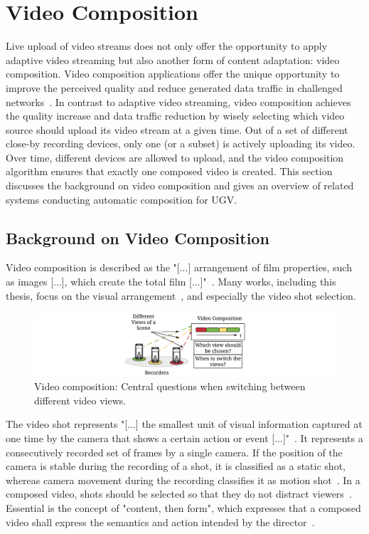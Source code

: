 \section{Video Composition}
\label{sec:240_videocomposition}
Live upload of video streams does not only offer the opportunity to apply adaptive video streaming but also another form of content adaptation: video composition.
Video composition applications offer the unique opportunity to improve the perceived quality and reduce generated data traffic in challenged networks~\cite{Arev2014,Saini2012,Shrestha2010,Wu2015}.
In contrast to adaptive video streaming, video composition achieves the quality increase and data traffic reduction by wisely selecting which video source should upload its video stream at a given time.
Out of a set of different close-by recording devices, only one (or a subset) is actively uploading its video.
Over time, different devices are allowed to upload, and the video composition algorithm ensures that exactly one composed video is created.
This section discusses the background on video composition and gives an overview of related systems conducting automatic composition for \ac{UGV}.
\subsection{Background on Video Composition}
Video composition is described as the "[...] arrangement of film properties, such as images [...], which create the total film [...]"~\cite[31]{Manchel1990}.
Many works, including this thesis, focus on the visual arrangement~\cite{Ward2003}, and especially the video shot selection.

\begin{figure}[tbh]
\centering
\includegraphics[width=\linewidth]{gfx/200_Background/RelatedWork_VideoComposition}
\caption[Central questions when switching between different video views]{Video composition: Central questions when switching between different video views.}
\label{fig:240_relatedworkvideocomposition}
\end{figure}

The video shot represents "[...] the smallest unit of visual information captured at one time by the camera that shows a certain action or event [...]"~\cite[2]{Bowen2013}.
It represents a consecutively recorded set of frames by a single camera.
If the position of the camera is stable during the recording of a shot, it is classified as a static shot, whereas camera movement during the recording classifies it as motion shot~\cite{Manchel1990}.
In a composed video, shots should be selected so that they do not distract viewers~\cite{Bowen2013}.
Essential is the concept of "content, then form", which expresses that a composed video shall express the semantics and action intended by the director~\cite{Manchel1990}.

